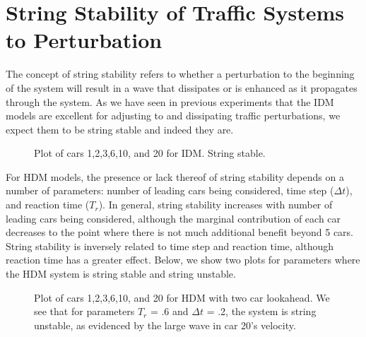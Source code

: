 \documentclass[12pt]{article}
\begin{document}
\section{String Stability of Traffic Systems to Perturbation}

The concept of string stability refers to whether a perturbation to the beginning of the system will result in a wave that dissipates or is enhanced as it propagates through the system. As we have seen in previous experiments that the IDM models are excellent for adjusting to and dissipating traffic perturbations, we expect them to be string stable and indeed they are.

\begin{figure}[H]
  \centering
  \caption{Plot of cars 1,2,3,6,10, and 20 for IDM. String stable.}
\end{figure}

For HDM models, the presence or lack thereof of string stability depends on a number of parameters: number of leading cars being considered, time step ($\Delta t$), and reaction time ($T_r$). In general, string stability increases with number of leading cars being considered, although the marginal contribution of each car decreases to the point where there is not much additional benefit beyond 5 cars. String stability is inversely related to time step and reaction time, although reaction time has a greater effect. Below, we show two plots for parameters where the HDM system is string stable and string unstable.

\begin{figure}[H]
  \centering
  \caption{Plot of cars 1,2,3,6,10, and 20 for HDM with two car lookahead. We see that for parameters $T_r$ = .6 and $\Delta t$ = .2, the system is string unstable, as evidenced by the large wave in car 20's velocity.}
\end{figure}
\end{document}

